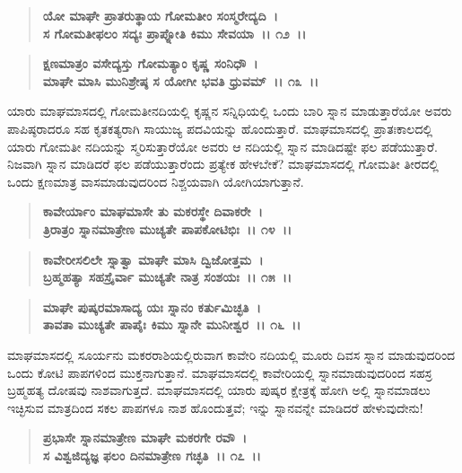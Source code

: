 \begin{verse}
\textbf{ಯೋ ಮಾಘೇ ಪ್ರಾತರುತ್ಥಾಯ ಗೋಮತೀಂ ಸಂಸ್ಮರೇದ್ಯದಿ~।}\\\textbf{ಸ ಗೋಮತೀಫಲಂ ಸದ್ಯಃ ಪ್ರಾಪ್ನೋತಿ ಕಿಮು ಸೇವಯಾ~।। ೧೨~।।} 
\end{verse}

\begin{verse}
\textbf{ಕ್ಷಣಮಾತ್ರಂ ವಸೇದ್ಯಸ್ತು ಗೋಮತ್ಯಾಂ ಕೃಷ್ಣ ಸಂನಿಧೌ~।}\\\textbf{ಮಾಘೇ ಮಾಸಿ ಮುನಿಶ್ರೇಷ್ಠ ಸ ಯೋಗೀ ಭವತಿ ಧ್ರುವಮ್~।। ೧೩~।।}
\end{verse}

ಯಾರು ಮಾಘಮಾಸದಲ್ಲಿ ಗೋಮತೀನದಿಯಲ್ಲಿ ಕೃಷ್ಣನ ಸನ್ನಿಧಿಯಲ್ಲಿ ಒಂದು ಬಾರಿ ಸ್ನಾನ ಮಾಡುತ್ತಾರೆಯೋ ಅವರು ಪಾಪಿಷ್ಠರಾದರೂ ಸಹ ಕೃತಕತ್ಯರಾಗಿ ಸಾಯುಜ್ಯ ಪದವಿಯನ್ನು ಹೊಂದುತ್ತಾರೆ. ಮಾಘಮಾಸದಲ್ಲಿ ಪ್ರಾತಃಕಾಲದಲ್ಲಿ ಯಾರು ಗೋಮತೀ ನದಿಯನ್ನು ಸ್ಮರಿಸುತ್ತಾರೆಯೋ ಅವರು ಆ ನದಿಯಲ್ಲಿ ಸ್ನಾನ ಮಾಡಿದಷ್ಟೇ ಫಲ ಪಡೆಯುತ್ತಾರೆ. ನಿಜವಾಗಿ ಸ್ನಾನ ಮಾಡಿದರೆ ಫಲ ಪಡೆಯುತ್ತಾರೆಂದು ಪ್ರತ್ಯೇಕ ಹೇಳಬೇಕೆ? ಮಾಘಮಾಸದಲ್ಲಿ ಗೋಮತೀ ತೀರದಲ್ಲಿ ಒಂದು ಕ್ಷಣಮಾತ್ರ ವಾಸಮಾಡುವುದರಿಂದ ನಿಶ್ಚಯವಾಗಿ ಯೋಗಿಯಾಗುತ್ತಾನೆ.

\begin{verse}
\textbf{ಕಾವೇರ್ಯಾಂ ಮಾಘಮಾಸೇ ತು ಮಕರಸ್ಥೇ ದಿವಾಕರೇ~।}\\\textbf{ತ್ರಿರಾತ್ರಂ ಸ್ನಾನಮಾತ್ರೇಣ ಮುಚ್ಯತೇ ಪಾಪಕೋಟಿಭಿಃ~।। ೧೪~।। }
\end{verse}

\begin{verse}
\textbf{ಕಾವೇರೀಸಲಿಲೇ ಸ್ನಾತ್ವಾ ಮಾಘೇ ಮಾಸಿ ದ್ವಿಜೋತ್ತಮ~।}\\\textbf{ಬ್ರಹ್ಮಹತ್ಯಾ ಸಹಸ್ರೈರ್ವಾ ಮುಚ್ಯತೇ ನಾತ್ರ ಸಂಶಯಃ~।। ೧೫~।।} 
\end{verse}

\begin{verse}
\textbf{ಮಾಘೇ ಪುಷ್ಕರಮಾಸಾದ್ಯ ಯಃ ಸ್ನಾನಂ ಕರ್ತುಮಿಚ್ಛತಿ~।}\\\textbf{ತಾವತಾ ಮುಚ್ಯತೇ ಪಾಪೈಃ ಕಿಮು ಸ್ನಾನೇ ಮುನೀಶ್ವರ~।। ೧೬~।।}
\end{verse}

ಮಾಘಮಾಸದಲ್ಲಿ ಸೂರ್ಯನು ಮಕರರಾಶಿಯಲ್ಲಿರುವಾಗ ಕಾವೇರಿ ನದಿಯಲ್ಲಿ ಮೂರು ದಿವಸ ಸ್ನಾನ ಮಾಡುವುದರಿಂದ ಒಂದು ಕೋಟಿ ಪಾಪಗಳಿಂದ ಮುಕ್ತನಾಗುತ್ತಾನೆ. ಮಾಘಮಾಸದಲ್ಲಿ ಕಾವೇರಿಯಲ್ಲಿ ಸ್ನಾನಮಾಡುವುದರಿಂದ ಸಹಸ್ರ ಬ್ರಹ್ಮಹತ್ಯ ದೋಷವು ನಾಶವಾಗುತ್ತದೆ. ಮಾಘಮಾಸದಲ್ಲಿ ಯಾರು ಪುಷ್ಕರ ಕ್ಷೇತ್ರಕ್ಕೆ ಹೋಗಿ ಅಲ್ಲಿ ಸ್ನಾನಮಾಡಲು ಇಚ್ಛಿಸುವ ಮಾತ್ರದಿಂದ ಸಕಲ ಪಾಪಗಳೂ ನಾಶ ಹೊಂದುತ್ತವೆ; ಇನ್ನು ಸ್ನಾನವನ್ನೇ ಮಾಡಿದರೆ ಹೇಳುವುದೇನು!

\begin{verse}
\textbf{ಪ್ರಭಾಸೇ ಸ್ನಾನಮಾತ್ರೇಣ ಮಾಘೇ ಮಕರಗೇ ರವೌ~।}\\\textbf{ಸ ವಿಶ್ವಜಿದ್ಯಜ್ಞ ಫಲಂ ದಿನಮಾತ್ರೇಣ ಗಚ್ಛತಿ~।। ೧೭~।। }
\end{verse}

